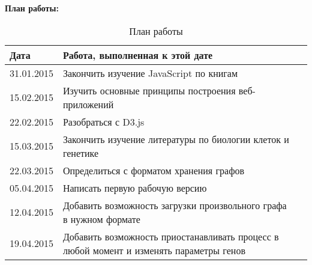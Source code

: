 \clearpage

\textbf{План работы:} 
\begin{table} [htbp]
  \centering
  \parbox{15cm}{\caption{План работы}\label{Ts0Sib}}
  \begin{tabular}{| p{3cm} || p{12cm}l |}
  \hline
  \hline
  Дата & Работа, выполненная к этой дате & \\
  \hline
  \hline
  31.01.2015 & Закончить изучение JavaScript по книгам \cite{bib1, bib2} & \\
  \hline
  15.02.2015  & Изучить основные принципы построения веб-приложений & \\
  \hline
  22.02.2015 & Разобраться с D3.js & \\
  \hline
  15.03.2015 & Закончить изучение литературы по биологии клеток и генетике \cite{bib3, bib4, bib5} & \\
  \hline
  22.03.2015 & Определиться с форматом хранения графов & \\
  \hline
  05.04.2015 & Написать первую рабочую версию & \\
  \hline
  12.04.2015 & Добавить возможность загрузки произвольного графа в нужном формате & \\
  \hline
  19.04.2015 & Добавить возможность приостанавливать процесс в любой момент и изменять параметры генов & \\
  \hline
  \hline
  \end{tabular}
\end{table}

\clearpage